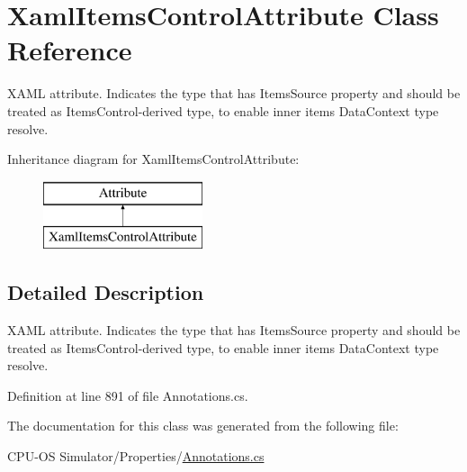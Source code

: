 \hypertarget{class_xaml_items_control_attribute}{}\section{Xaml\+Items\+Control\+Attribute Class Reference}
\label{class_xaml_items_control_attribute}


X\+A\+M\+L attribute. Indicates the type that has {\ttfamily Items\+Source} property and should be treated as {\ttfamily Items\+Control}-\/derived type, to enable inner items {\ttfamily Data\+Context} type resolve.  


Inheritance diagram for Xaml\+Items\+Control\+Attribute\+:\begin{figure}[H]
\begin{center}
\leavevmode
\includegraphics[height=2.000000cm]{class_xaml_items_control_attribute}
\end{center}
\end{figure}


\subsection{Detailed Description}
X\+A\+M\+L attribute. Indicates the type that has {\ttfamily Items\+Source} property and should be treated as {\ttfamily Items\+Control}-\/derived type, to enable inner items {\ttfamily Data\+Context} type resolve. 



Definition at line 891 of file Annotations.\+cs.



The documentation for this class was generated from the following file\+:\begin{DoxyCompactItemize}
\item 
C\+P\+U-\/\+O\+S Simulator/\+Properties/\hyperlink{_annotations_8cs}{Annotations.\+cs}\end{DoxyCompactItemize}
